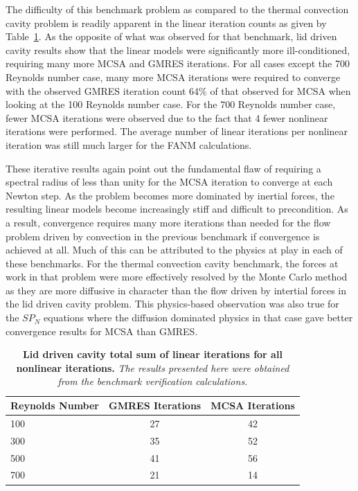 The difficulty of this benchmark problem as compared to the thermal
convection cavity problem is readily apparent in the linear iteration
counts as given by Table~\ref{tab:driven_linear_iter_comparison}. As
the opposite of what was observed for that benchmark, lid driven
cavity results show that the linear models were significantly more
ill-conditioned, requiring many more MCSA and GMRES iterations. For
all cases except the 700 Reynolds number case, many more MCSA
iterations were required to converge with the observed GMRES iteration
count 64\% of that observed for MCSA when looking at the 100 Reynolds
number case. For the 700 Reynolds number case, fewer MCSA iterations
were observed due to the fact that 4 fewer nonlinear iterations were
performed. The average number of linear iterations per nonlinear
iteration was still much larger for the FANM calculations.

These iterative results again point out the fundamental flaw of
requiring a spectral radius of less than unity for the MCSA iteration
to converge at each Newton step. As the problem becomes more dominated
by inertial forces, the resulting linear models become increasingly
stiff and difficult to precondition. As a result, convergence requires
many more iterations than needed for the flow problem driven by
convection in the previous benchmark if convergence is achieved at
all. Much of this can be attributed to the physics at play in each of
these benchmarks. For the thermal convection cavity benchmark, the
forces at work in that problem were more effectively resolved by the
Monte Carlo method as they are more diffusive in character than the
flow driven by intertial forces in the lid driven cavity problem. This
physics-based observation was also true for the $SP_N$ equations where
the diffusion dominated physics in that case gave better convergence
results for MCSA than GMRES. 

\begin{table}[h!]
  \begin{center}
    \begin{tabular}{lcc}\hline\hline
      \multicolumn{1}{l}{Reynolds Number}& 
      \multicolumn{1}{c}{GMRES Iterations}&
      \multicolumn{1}{c}{MCSA Iterations}\\
      \hline
      100 & 27 & 42 \\
      300 & 35 & 52 \\
      500 & 41 & 56 \\
      700 & 21 & 14 \\
      \hline\hline
    \end{tabular}
  \end{center}
  \caption{\textbf{Lid driven cavity total sum of linear
      iterations for all nonlinear iterations.} \textit{The results
      presented here were obtained from the benchmark verification
      calculations.}}
  \label{tab:driven_linear_iter_comparison}
\end{table}

